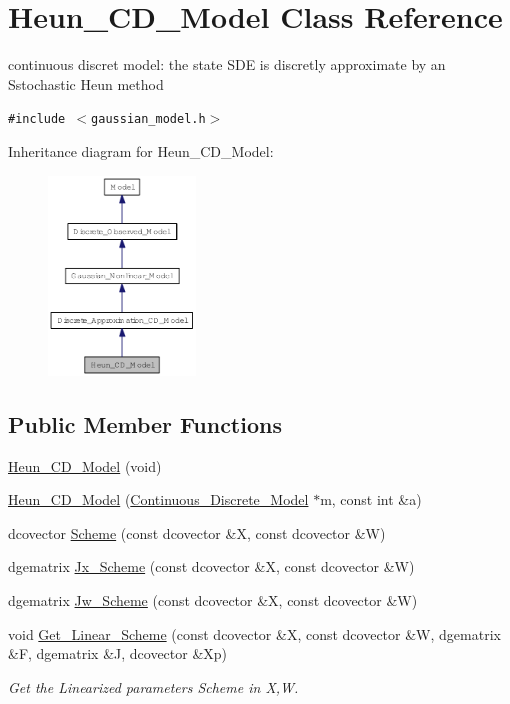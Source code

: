 \hypertarget{class_heun___c_d___model}{
\section{Heun\_\-CD\_\-Model Class Reference}
\label{class_heun___c_d___model}
}
continuous discret model: the state SDE is discretly approximate by an Sstochastic Heun method  


{\tt \#include $<$gaussian\_\-model.h$>$}

Inheritance diagram for Heun\_\-CD\_\-Model:\nopagebreak
\begin{figure}[H]
\begin{center}
\leavevmode
\includegraphics[width=111pt]{class_heun___c_d___model__inherit__graph}
\end{center}
\end{figure}
\subsection*{Public Member Functions}
\begin{CompactItemize}
\item 
\hyperlink{class_heun___c_d___model_1fa492e132304f4dbd1c722c1cd0d9a5}{Heun\_\-CD\_\-Model} (void)
\item 
\hyperlink{class_heun___c_d___model_4a6a03c0d4fd6381c0ba150761cec1cc}{Heun\_\-CD\_\-Model} (\hyperlink{class_continuous___discrete___model}{Continuous\_\-Discrete\_\-Model} $\ast$m, const int \&a)
\item 
dcovector \hyperlink{class_heun___c_d___model_98a85a23296e6c9f422f12063ece307b}{Scheme} (const dcovector \&X, const dcovector \&W)
\item 
dgematrix \hyperlink{class_heun___c_d___model_322cd83c0b81c2ed81483f42123f08e6}{Jx\_\-Scheme} (const dcovector \&X, const dcovector \&W)
\item 
dgematrix \hyperlink{class_heun___c_d___model_000fb9b8dbfb8171b8f330d7fc6d0dce}{Jw\_\-Scheme} (const dcovector \&X, const dcovector \&W)
\item 
void \hyperlink{class_heun___c_d___model_38c51141d41b3c92509ab2c6040fd2cd}{Get\_\-Linear\_\-Scheme} (const dcovector \&X, const dcovector \&W, dgematrix \&F, dgematrix \&J, dcovector \&Xp)
\begin{CompactList}\small\item\em Get the Linearized parameters Scheme in X,W. \item\end{CompactList}\end{CompactItemize}


